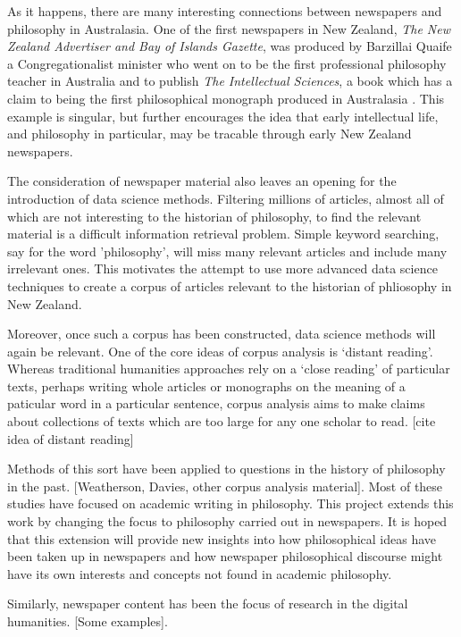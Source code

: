 As it happens, there are many interesting connections between newspapers and philosophy in Australasia. One of the first newspapers in New Zealand, \textit{The New Zealand Advertiser and Bay of Islands Gazette}, was produced by Barzillai Quaife a Congregationalist minister who went on to be the first professional philosophy teacher in Australia and to publish \textit{The Intellectual Sciences}, a book which has a claim to being the first philosophical monograph produced in Australasia \cite[16--17]{davies-2014}. This example is singular, but further encourages the idea that early intellectual life, and philosophy in particular, may be tracable through early New Zealand newspapers.

The consideration of newspaper material also leaves an opening for the introduction of data science methods. Filtering millions of articles, almost all of which are not interesting to the historian of philosophy, to find the relevant material is a difficult information retrieval problem. Simple keyword searching, say for the word 'philosophy', will miss many relevant articles and include many irrelevant ones. This motivates the attempt to use more advanced data science techniques to create a corpus of articles relevant to the historian of phliosophy in New Zealand.

Moreover, once such a corpus has been constructed, data science methods will
again be relevant. One of the core ideas of corpus analysis is `distant reading'. Whereas traditional humanities approaches rely on a `close reading' of particular texts, perhaps writing whole articles or monographs on the meaning of a paticular word in a particular sentence, corpus analysis aims to make claims about collections of texts which are too large for any one scholar to read. [cite idea of distant reading]

Methods of this sort have been applied to questions in the history of philosophy in the past. [Weatherson, Davies, other corpus analysis material]. Most of these studies have focused on academic writing in philosophy. This project extends this work by changing the focus to philosophy carried out in newspapers. It is hoped that this extension will provide new insights into how philosophical ideas have been taken up in newspapers and how newspaper philosophical discourse might have its own interests and concepts not found in academic philosophy.

Similarly, newspaper content has been the focus of research in the digital humanities. [Some examples].



